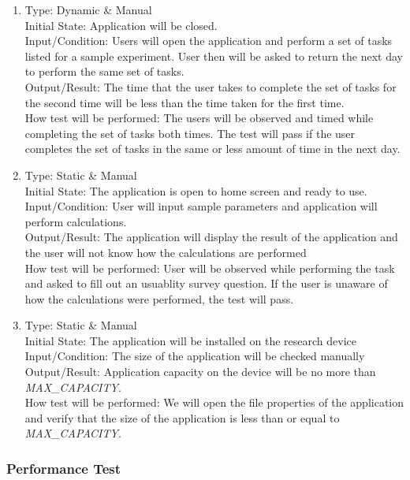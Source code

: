 \documentclass[12pt, titlepage]{article}
\begin{document}
\begin{adjustwidth}{2.2em}{0pt}
\begin{enumerate}[{NF-UT}1.]
  \item Type: Dynamic \& Manual\\
  Initial State: Application will be closed.\\
  Input/Condition: Users will open the application and perform a set of tasks listed for a sample experiment. User then will be asked to return the next day to perform the same set of tasks.\\
  Output/Result:  The time that the user takes to complete the set of tasks for the second time will be less than the time taken for the first time.\\
  How test will be performed: The users will be observed and timed while completing the set of tasks both times. The test will pass if the user completes the set of tasks in the same or less amount of time in the next day.

  \item Type: Static \& Manual\\
  Initial State: The application is open to home screen and ready to use.\\
  Input/Condition: User will input sample parameters and application will perform calculations.\\
  Output/Result: The application will display the result of the application and the user will not know how the calculations are performed \\
  How test will be performed: User will be observed while performing the task and asked to fill out an usuablity survey question. If the user is unaware of how the calculations were performed, the test will pass.

  \item Type: Static \& Manual\\
  Initial State: The application will be installed on the research device\\
  Input/Condition: The size of the application will be checked manually\\
  Output/Result: Application capacity on the device will be no more than \textsl{MAX\_CAPACITY}. \\
  How test will be performed: We will open the file properties of the application and verify that the size of the application is less than or equal to \textsl{MAX\_CAPACITY}.
\end{enumerate}
\end{adjustwidth}

\subsubsection{Performance Test}
\end{document}

